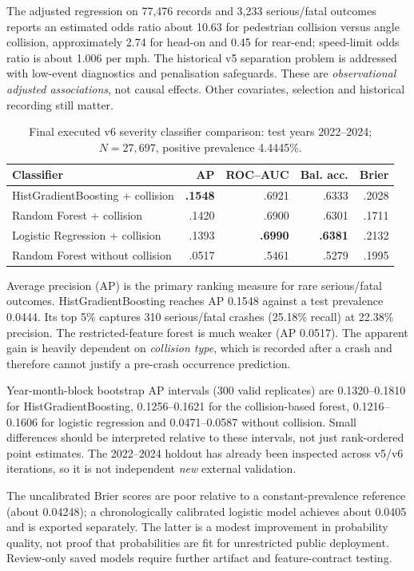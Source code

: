 \documentclass[11pt,a4paper,openany]{report}
\begin{document}
The adjusted regression on 77,476 records and 3,233 serious/fatal outcomes reports an estimated odds ratio about 10.63 for pedestrian collision versus angle collision, approximately 2.74 for head-on and 0.45 for rear-end; speed-limit odds ratio is about 1.006 per mph. The historical v5 separation problem is addressed with low-event diagnostics and penalisation safeguards. These are \emph{observational adjusted associations}, not causal effects. Other covariates, selection and historical recording still matter.

\begin{table}[htbp]\centering\small
\caption{Final executed v6 severity classifier comparison: test years 2022--2024; $N=27{,}697$, positive prevalence 4.4445\%.}
\begin{tabular}{@{}L{54mm}rrrr@{}}\toprule
Classifier & AP & ROC--AUC & Bal. acc. & Brier\\\midrule
HistGradientBoosting + collision & \textbf{.1548} & .6921 & .6333 & .2028\\
Random Forest + collision & .1420 & .6900 & .6301 & .1711\\
Logistic Regression + collision & .1393 & \textbf{.6990} & \textbf{.6381} & .2132\\
Random Forest without collision & .0517 & .5461 & .5279 & .1995\\\bottomrule
\end{tabular}
\end{table}

Average precision (AP) is the primary ranking measure for rare serious/fatal outcomes. HistGradientBoosting reaches AP 0.1548 against a test prevalence 0.0444. Its top 5\% captures 310 serious/fatal crashes (25.18\% recall) at 22.38\% precision. The restricted-feature forest is much weaker (AP 0.0517). The apparent gain is heavily dependent on \emph{collision type}, which is recorded after a crash and therefore cannot justify a pre-crash occurrence prediction.

Year-month-block bootstrap AP intervals (300 valid replicates) are 0.1320--0.1810 for HistGradientBoosting, 0.1256--0.1621 for the collision-based forest, 0.1216--0.1606 for logistic regression and 0.0471--0.0587 without collision. Small differences should be interpreted relative to these intervals, not just rank-ordered point estimates. The 2022--2024 holdout has already been inspected across v5/v6 iterations, so it is not independent \emph{new} external validation.

The uncalibrated Brier scores are poor relative to a constant-prevalence reference (about 0.04248); a chronologically calibrated logistic model achieves about 0.0405 and is exported separately. The latter is a modest improvement in probability quality, not proof that probabilities are fit for unrestricted public deployment. Review-only saved models require further artifact and feature-contract testing.
\end{document}
